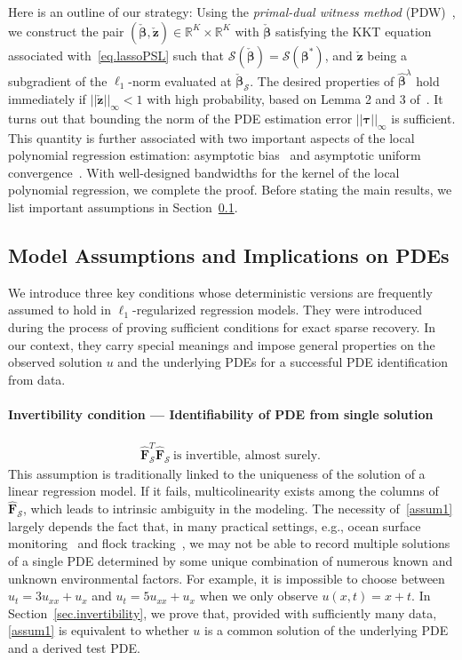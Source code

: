 \documentclass[a4paper,11pt]{article}
\newcommand{\btau}{\bm{\tau}}
\newcommand{\bbeta}{\bm{\beta}}
\newcommand{\bF}{\mathbf{F}}
\newcommand{\mS}{\mathcal{S}}
\begin{document}
Here is an outline of our strategy: Using the \textit{primal-dual witness method} (PDW)~\cite{wainwright2009sharp}, we construct the pair $(\check{\bbeta},\check{\mathbf{z}})\in\mathbb{R}^{K}\times\mathbb{R}^{K}$ with $\check{\bbeta}$ satisfying the KKT equation associated with~\eqref{eq.lassoPSL} such that $\mS(\check{\bbeta})=\mS(\bbeta^*)$, and $\check{\mathbf{z}}$ being a subgradient of the $\ell_1$-norm evaluated at $\check{\bbeta}_\mS$. The desired properties of $\widehat{\bbeta}^\lambda$ hold immediately if $||\check{\mathbf{z}}||_\infty<1$ with high probability, based on Lemma 2 and 3 of~\cite{wainwright2009sharp}. It turns out that bounding the norm of the PDE estimation error  $||\btau||_\infty$ is sufficient. This quantity is further associated with two important aspects of the local polynomial regression estimation: asymptotic bias~\cite{fan1997local} and asymptotic uniform convergence~\cite{mack1982weak}. With well-designed bandwidths for the kernel of the local polynomial regression, we complete the proof. Before stating the main results, we list important assumptions in Section~\ref{sec.assumptions}.



\subsection{Model Assumptions and Implications on PDEs}\label{sec.assumptions}
We introduce three key conditions whose deterministic versions are frequently assumed to hold in $\ell_1$-regularized regression models. They were introduced during the process of proving sufficient conditions for exact sparse recovery. In our context, they carry special meanings and impose general properties on the observed solution $u$ and the underlying PDEs for a successful PDE identification from data.

\paragraph{Invertibility condition --- Identifiability of PDE from single solution}
\begin{align}
\widehat{\bF}_{\mS}^T\widehat{\bF}_\mS~\text{is invertible, almost surely.}~\label{assum1}\tag{A1}
\end{align}
This assumption is traditionally linked to the uniqueness of the solution of a linear regression model. If it fails, multicolinearity exists among the columns of $\widehat{\bF}_\mS$, which leads to intrinsic ambiguity in the modeling. The necessity of~\eqref{assum1} largely depends the fact that, in many practical settings, e.g., ocean surface monitoring~\cite{fox2001monitoring} and flock tracking~\cite{michele2016radar}, we may not be able to record multiple solutions of a single PDE determined by some unique combination of numerous known and unknown environmental factors. For example, it is impossible to choose between $u_t=3u_{xx}+u_x$ and $u_t = 5u_{xx}+u_x$ when we only observe $u(x,t)=x+t$. In Section~\ref{sec.invertibility}, we prove that, provided with sufficiently many data, \eqref{assum1} is equivalent to whether $u$ is a common solution of the underlying PDE and a derived test PDE.
\end{document}
